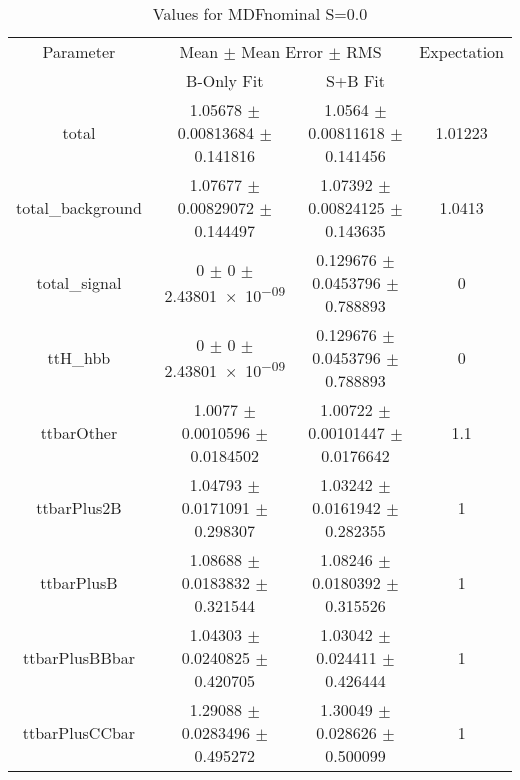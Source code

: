\begin{table}
\centering
\caption{Values for MDFnominal S=0.0}
\begin{tabular}{cccc}
\toprule
Parameter & \multicolumn{2}{c}{Mean $\pm$ Mean Error $\pm$ RMS} & Expectation\\
 & B-Only Fit & S+B Fit & \\
\midrule
total & \num{1.05678} $\pm$ \num{0.00813684} $\pm$ \num{0.141816} & \num{1.0564} $\pm$ \num{0.00811618} $\pm$ \num{0.141456} & \num{1.01223}\\
total\_background & \num{1.07677} $\pm$ \num{0.00829072} $\pm$ \num{0.144497} & \num{1.07392} $\pm$ \num{0.00824125} $\pm$ \num{0.143635} & \num{1.0413}\\
total\_signal & \num{0} $\pm$ \num{0} $\pm$ \num{2.43801e-09} & \num{0.129676} $\pm$ \num{0.0453796} $\pm$ \num{0.788893} & \num{0}\\
ttH\_hbb & \num{0} $\pm$ \num{0} $\pm$ \num{2.43801e-09} & \num{0.129676} $\pm$ \num{0.0453796} $\pm$ \num{0.788893} & \num{0}\\
ttbarOther & \num{1.0077} $\pm$ \num{0.0010596} $\pm$ \num{0.0184502} & \num{1.00722} $\pm$ \num{0.00101447} $\pm$ \num{0.0176642} & \num{1.1}\\
ttbarPlus2B & \num{1.04793} $\pm$ \num{0.0171091} $\pm$ \num{0.298307} & \num{1.03242} $\pm$ \num{0.0161942} $\pm$ \num{0.282355} & \num{1}\\
ttbarPlusB & \num{1.08688} $\pm$ \num{0.0183832} $\pm$ \num{0.321544} & \num{1.08246} $\pm$ \num{0.0180392} $\pm$ \num{0.315526} & \num{1}\\
ttbarPlusBBbar & \num{1.04303} $\pm$ \num{0.0240825} $\pm$ \num{0.420705} & \num{1.03042} $\pm$ \num{0.024411} $\pm$ \num{0.426444} & \num{1}\\
ttbarPlusCCbar & \num{1.29088} $\pm$ \num{0.0283496} $\pm$ \num{0.495272} & \num{1.30049} $\pm$ \num{0.028626} $\pm$ \num{0.500099} & \num{1}\\
\bottomrule
\end{tabular}
\end{table}